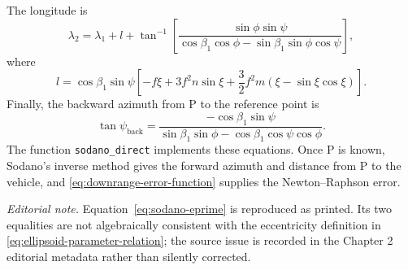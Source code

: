 The longitude is
\begin{equation}
  \lambda_2=\lambda_1+l
  +\tan^{-1}\!\left[
    \frac{\sin\phi\sin\psi}
         {\cos\beta_1\cos\phi-\sin\beta_1\sin\phi\cos\psi}
  \right],
  \label{eq:sodano-direct-longitude}
\end{equation}
where
\begin{equation}
  l=\cos\beta_1\sin\psi
    \left[-f\xi+3f^2n\sin\xi
          +\frac32f^2m(\xi-\sin\xi\cos\xi)\right].
  \label{eq:sodano-direct-l-correction}
\end{equation}
Finally, the backward azimuth from P to the reference point is
\begin{equation}
  \tan\psi_{\mathrm{back}}
  =\frac{-\cos\beta_1\sin\psi}
         {\sin\beta_1\sin\phi-\cos\beta_1\cos\psi\cos\phi}.
  \label{eq:sodano-direct-backward-azimuth}
\end{equation}
The function \texttt{sodano\_direct} implements these equations. Once P is known,
Sodano's inverse method gives the forward azimuth and distance from P to the
vehicle, and \cref{eq:downrange-error-function} supplies the Newton--Raphson
error.

\noindent\textit{Editorial note.} Equation~\ref{eq:sodano-eprime} is reproduced
as printed. Its two equalities are not algebraically consistent with the eccentricity
definition in \cref{eq:ellipsoid-parameter-relation}; the source issue is recorded in
the Chapter 2 editorial metadata rather than silently corrected.
